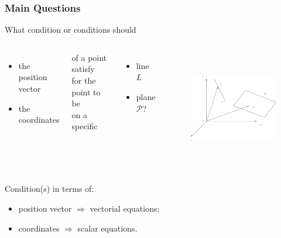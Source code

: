\begin{frame}
 \frametitle{Main Questions}

What condition or conditions should

\begin{columns}[t]
  \column[T]{5cm}
  \begin{itemize}
    \item the position vector
    \item the coordinates
  \end{itemize}

of a point satisfy\\
for the point to be\\
on a specific\\

\begin{itemize}
    \item line $L$
    \item plane $\mathcal{P}$?
\end{itemize}
  \column[T]{7cm}
    \begin{figure}
        \includegraphics[height=2in]{../../modules/vectors/pictures/ok-lines_planes.eps}
    \end{figure}
\end{columns}

Condition(s) in terms of:
\begin{itemize}
    \item position vector $\Rightarrow$ vectorial equations;
    \item coordinates $\Rightarrow$ scalar equations.
\end{itemize}
\end{frame}